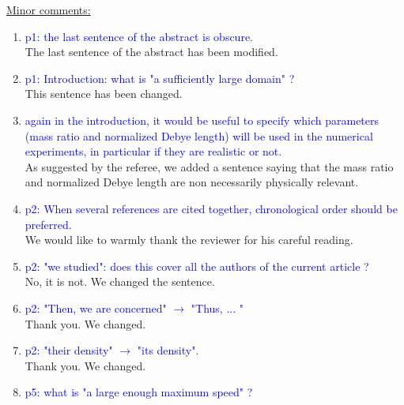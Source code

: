 \documentclass{article}
\begin{document}
\underline{Minor comments:}
\begin{enumerate}
    \item \textcolor{blue}{p1: the last sentence of the abstract is obscure.}  \\
    The last sentence of the abstract has been modified. 
        \item \textcolor{blue}{p1: Introduction: what is "a sufficiently large domain" ? }\\ 
This sentence has been changed. 
        \item \textcolor{blue}{again in the introduction, it would be useful to specify which parameters (mass ratio and normalized Debye length) will be used in the numerical experiments, in particular if they are realistic or not.} \\
       As suggested by the referee, we added a sentence saying that the mass ratio and normalized Debye length are non necessarily physically relevant. %
        \item \textcolor{blue}{p2: When several references are cited together, chronological order should be preferred.} \\ 
  We would like to warmly thank the reviewer for his careful reading.        
        \item \textcolor{blue}{p2: "we studied": does this cover all the authors of the current article ?}\\
No, it is not. We changed the sentence. 
        \item \textcolor{blue}{p2: "Then, we are concerned" $\to$ "Thus, ... "}\\ 
Thank you. We changed. 
        \item \textcolor{blue}{p2: "their density" $\to$ "its density".} \\
        Thank you. We changed. 
        \item \textcolor{blue}{p5: what is "a large enough maximum speed" ? }\\ 

\end{enumerate}
\end{document}
